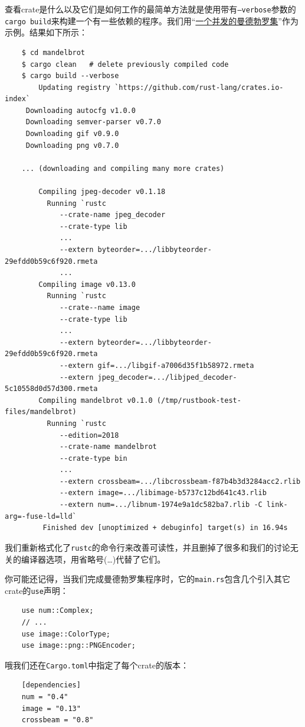 查看crate是什么以及它们是如何工作的最简单方法就是使用带有\texttt{--verbose}参数的\texttt{cargo build}来构建一个有一些依赖的程序。我们用“\hyperref[mandelbrot]{一个并发的曼德勃罗集}”作为示例。结果如下所示：
\begin{verbatim}
    $ cd mandelbrot
    $ cargo clean   # delete previously compiled code
    $ cargo build --verbose
        Updating registry `https://github.com/rust-lang/crates.io-index`
     Downloading autocfg v1.0.0
     Downloading semver-parser v0.7.0
     Downloading gif v0.9.0
     Downloading png v0.7.0
    
    ... (downloading and compiling many more crates)

        Compiling jpeg-decoder v0.1.18
          Running `rustc
             --crate-name jpeg_decoder
             --crate-type lib
             ...
             --extern byteorder=.../libbyteorder-29efdd0b59c6f920.rmeta
             ...
        Compiling image v0.13.0
          Running `rustc
             --crate--name image
             --crate-type lib
             ...
             --extern byteorder=.../libbyteorder-29efdd0b59c6f920.rmeta
             --extern gif=.../libgif-a7006d35f1b58972.rmeta
             --extern jpeg_decoder=.../libjped_decoder-5c10558d0d57d300.rmeta
        Compiling mandelbrot v0.1.0 (/tmp/rustbook-test-files/mandelbrot)
          Running `rustc
             --edition=2018
             --crate-name mandelbrot
             --crate-type bin
             ...
             --extern crossbeam=.../libcrossbeam-f87b4b3d3284acc2.rlib
             --extern image=.../libimage-b5737c12bd641c43.rlib
             --extern num=.../libnum-1974e9a1dc582ba7.rlib -C link-arg=-fuse-ld=lld`
         Finished dev [unoptimized + debuginfo] target(s) in 16.94s
\end{verbatim}

我们重新格式化了\texttt{rustc}的命令行来改善可读性，并且删掉了很多和我们的讨论无关的编译器选项，用省略号(\ldots)代替了它们。

你可能还记得，当我们完成曼德勃罗集程序时，它的\texttt{main.rs}包含几个引入其它crate的\texttt{use}声明：
\begin{verbatim}
    use num::Complex;
    // ...
    use image::ColorType;
    use image::png::PNGEncoder;
\end{verbatim}

哦我们还在\texttt{Cargo.toml}中指定了每个crate的版本：
\begin{verbatim}
    [dependencies]
    num = "0.4"
    image = "0.13"
    crossbeam = "0.8"
\end{verbatim}

